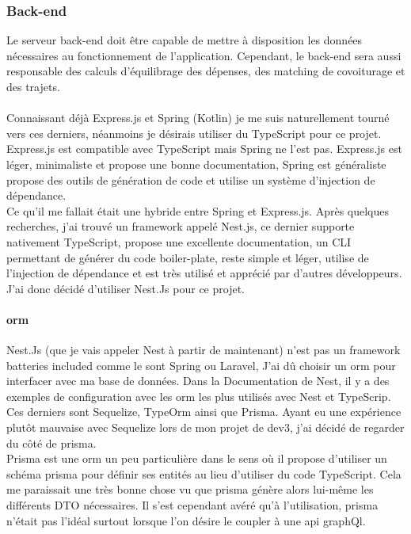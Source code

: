\subsubsection{Back-end}\label{subsubsec:back-end}
Le serveur back-end doit être capable de mettre à disposition les données nécessaires au fonctionnement de l'application.
Cependant, le back-end sera aussi responsable des calculs d'équilibrage des dépenses, des matching de covoiturage et des trajets.\\\\

Connaissant déjà Express.js et Spring (Kotlin) je me suis naturellement tourné vers ces derniers, néanmoins je désirais utiliser du TypeScript pour ce projet.
Express.js est compatible avec TypeScript mais Spring ne l'est pas.
Express.js est léger, minimaliste et propose une bonne documentation,
Spring est généraliste propose des outils de génération de code et utilise un système d'injection de dépendance.\\

Ce qu'il me fallait était une hybride entre Spring et Express.js.
Après quelques recherches, j'ai trouvé un framework appelé Nest.js, ce dernier supporte nativement TypeScript, propose une excellente documentation,
un CLI permettant de générer du code boiler-plate, reste simple et léger, utilise de l'injection de dépendance et est très utilisé et apprécié par d'autres développeurs.
J'ai donc décidé d'utiliser Nest.Js pour ce projet.

\paragraph{\Gls{orm}}
Nest.Js (que je vais appeler Nest à partir de maintenant) n'est pas un framework batteries included comme le sont Spring ou Laravel,
J'ai dû choisir un \Gls{orm} pour interfacer avec ma base de données.
Dans la Documentation de Nest, il y a des exemples de configuration avec les \Gls{orm} les plus utilisés avec Nest et TypeScrip.
Ces derniers sont Sequelize, TypeOrm ainsi que Prisma.
Ayant eu une expérience plutôt mauvaise avec Sequelize lors de mon projet de dev3, j'ai décidé de regarder du côté de prisma.\\

Prisma est une \Gls{orm} un peu particulière dans le sens où il propose d'utiliser un schéma prisma pour définir ses entités au lieu d'utiliser du code TypeScript.
Cela me paraissait une très bonne chose vu que prisma génère alors lui-même les différents DTO nécessaires.
Il s'est cependant avéré qu'à l'utilisation, prisma n'était pas l'idéal surtout lorsque l'on désire le coupler à une \Gls{api} graphQl.\\

